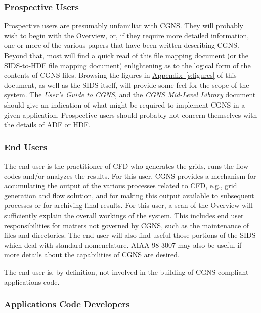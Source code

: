\subsubsection{Prospective Users}

Prospective users are presumably unfamiliar with CGNS. They will
probably wish to begin with the Overview, or, if they require more
detailed information, one or more of the various papers that have been
written describing CGNS.
Beyond that, most will find a quick read of this file mapping document
(or the SIDS-to-HDF file mapping document) enlightening as to the
logical form of the contents of CGNS files.
Browsing the figures in
\hyperref[s:figures]{Appendix~\ref*{s:figures}}
of this document, as well as the SIDS itself, will provide some feel
for the scope of the system.
The \textit{User's Guide to CGNS}, and the \textit{CGNS Mid-Level
Library} document should give an indication of what might be required to
implement CGNS in a given application.
Prospective users should probably not concern themselves with the
details of ADF or HDF.

\subsubsection{End Users}

The end user is the practitioner of CFD who generates the grids,
runs the flow codes and/or analyzes the results. For this user, CGNS
provides a mechanism for accumulating the output of the various
processes related to CFD, e.g., grid generation and flow solution,
and for making this output available to subsequent processes or for
archiving final results. For this user, a scan of the Overview will
sufficiently explain the overall workings of the system. This includes
end user responsibilities for matters not governed by CGNS, such as the
maintenance of files and directories. The end user will also find useful
those portions of the SIDS which deal with standard nomenclature. AIAA
98-3007 may also be useful if more details about the capabilities of
CGNS are desired.

The end user is, by definition, not involved in the building of
CGNS-compliant applications code.

\subsubsection{Applications Code Developers}

